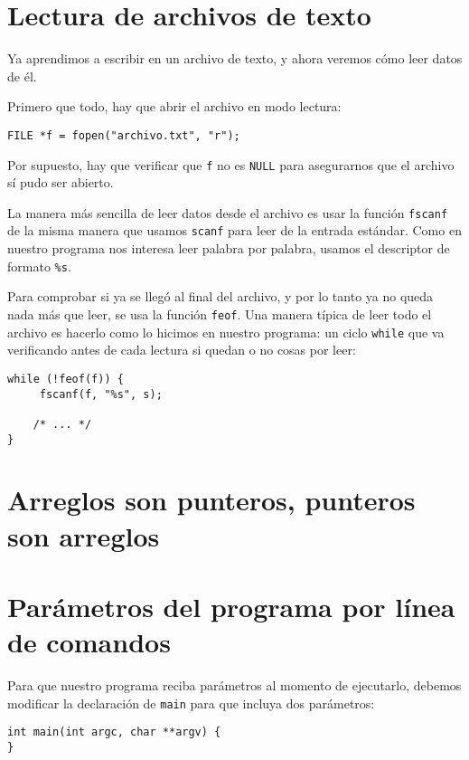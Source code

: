 \section{Lectura de archivos de texto}

Ya aprendimos a escribir en un archivo de texto, y ahora veremos cómo
leer datos de él.

Primero que todo, hay que abrir el archivo en modo lectura:

\begin{lstlisting}
FILE *f = fopen("archivo.txt", "r");
\end{lstlisting}

Por supuesto, hay que verificar que \lstinline!f! no es \lstinline!NULL!
para asegurarnos que el archivo sí pudo ser abierto.

La manera más sencilla de leer datos desde el archivo es usar la función
\lstinline!fscanf! de la misma manera que usamos \lstinline!scanf! para
leer de la entrada estándar. Como en nuestro programa nos interesa leer
palabra por palabra, usamos el descriptor de formato \lstinline!%s!.

Para comprobar si ya se llegó al final del archivo, y por lo tanto ya no
queda nada más que leer, se usa la función \lstinline!feof!. Una manera
típica de leer todo el archivo es hacerlo como lo hicimos en nuestro
programa: un ciclo \lstinline!while! que va verificando antes de cada
lectura si quedan o no cosas por leer:

\begin{lstlisting}
while (!feof(f)) {
     fscanf(f, "%s", s);

    /* ... */
}
\end{lstlisting}

\section{Arreglos son punteros, punteros son arreglos}

\section{Parámetros del programa por línea de comandos}

Para que nuestro programa reciba parámetros al momento de ejecutarlo,
debemos modificar la declaración de \lstinline!main! para que incluya
dos parámetros:

\begin{lstlisting}
int main(int argc, char **argv) {
}
\end{lstlisting}


